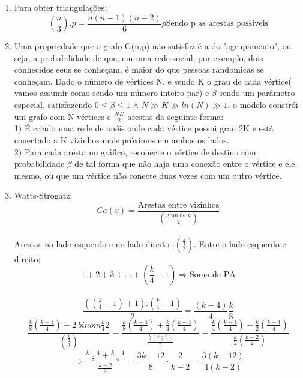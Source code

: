 \documentclass[11pt,reqno]{amsart}
\begin{document}
\begin{enumerate}
		\vspace{0.3cm}

		\item Para obter triangulações: \[ \binom{n}{3}.p = \frac{n(n-1)(n-2)}{6}p\text{Sendo p as arestas 
		possíveis}\]
		
		\vspace{0.3cm}

		\item Uma propriedade que o grafo G(n,p) não satisfaz é a do "agrupamento", ou seja, a 
		probabilidade de que, em uma rede social, por exemplo, dois conhecidos seus se conheçam, é maior do 
		que pessoas randomicas se conheçam. Dado o número de vértices N, e sendo K o grau de cada vértice( 
		vamos assumir como sendo um número inteiro par) e $\beta$ sendo um parâmetro especial, satisfazendo
		$0 \leq \beta \leq 1$  $\wedge$  $N \gg K \gg ln(N) \gg 1 $, o modelo constrói um grafo com N 
		vértices e $\frac{NK}{2}$ arestas da seguinte forma: \\ 1) É criado uma rede de anéis onde cada 
		vértice possui grau 2K e está conectado a K vizinhos mais próximos em ambos os lados. \\ 2) Para
		cada aresta no gráfico, reconecte o vértice de destino com probabilidade $\beta$ de tal forma que 
		não haja uma conexão entre o vértice e ele mesmo, ou que um vértice não conecte duas vezes com um 
		outro vértice. 

		\vspace{5cm}

		\item Watts-Strogatz: 
		\[Ca(v)=\frac{\text{Arestas entre vizinhos}}{\binom{\text{grau de v}}{2}} \] \\
		Arestas no lado esquerdo e no lado direito :$\binom{\frac{k}{4}}{2}$.  
		Entre o lado esquerdo e direito: \[1+2+3+...+(\frac{k}{4}-1) \Rightarrow \text{Soma de PA} \] \\ 
		 \[\frac{((\frac{k}{4}-1)+1).(\frac{k}{4}-1)}{2} = \frac{(k-4)}{4}\frac{k}{8} \]
		\[ \frac{\frac{k}{8}(\frac{k-4}{4})+2 \
		binom{\frac{k}{4}}{2}}{\binom{\frac{k}{2}}{2}} = \frac{\frac{k}{8}(\frac{k-4}{4}) + \frac{k}{4}(
		\frac{k-4}{4})}{\frac{\frac{k}{2}(\frac{k-2}{2})}{2}} = \frac{\frac{k}{4}(\frac{k-4}{4}) + \frac{k}{
		2}(\frac{k-4}{4})}{\frac{k}{2}(\frac{k-2}{2})} \] \[ \Rightarrow \frac{\frac{k-4}{8}+\frac{k-4}{4}}
		{\frac{k-2}{2}} = \frac{3k-12}{8} \cdot \frac{2}{k-2} = \frac{3(k-12)}{4(k-2)} \]
		

\end{enumerate}
\end{document}
